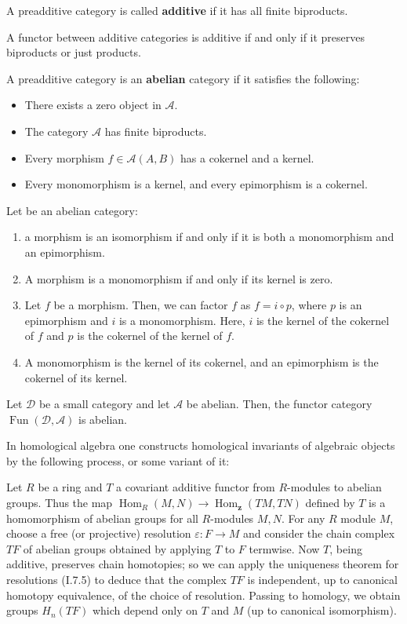 A preadditive category is called \textbf{additive} if it has all finite biproducts.\\

\begin{prop}
A functor between additive categories is additive if and only if it preserves biproducts or just products.
\end{prop}

A preadditive category is an \textbf{abelian} category if it satisfies the following: 
\begin{itemize}
    \item There exists a zero object in $\mathcal{A}$.
    \item The category $\mathcal{A}$ has finite biproducts.
    \item Every morphism $f \in \mathcal{A}(A, B)$ has a cokernel and a kernel.
    \item Every monomorphism is a kernel, and every epimorphism is a cokernel.
\end{itemize}

\begin{theo} Let \ca be an abelian category:
\begin{enumerate}
    \item a morphism is an isomorphism if and only if it is both a monomorphism and an epimorphism.
    \item A morphism is a monomorphism if and only if its kernel is zero.
    \item Let $f$ be a morphism. Then, we can factor $f$ as $f=i \circ p$, where $p$ is an epimorphism and $i$ is a monomorphism. Here, $i$ is the kernel of the cokernel of $f$ and $p$ is the cokernel of the kernel of $f$.
    \item A monomorphism is the kernel of its cokernel, and an epimorphism is the cokernel of its kernel.
\end{enumerate}   
\end{theo}

\begin{prop}
Let $\mathcal{D}$ be a small category and let $\mathcal{A}$ be abelian. Then, the functor category $\operatorname{Fun}(\mathcal{D}, \mathcal{A})$ is abelian.   
\end{prop}

In homological algebra one constructs homological invariants of algebraic objects by the following process, or some variant of it:

Let $R$ be a ring and $T$ a covariant additive functor from $R$-modules to abelian groups. Thus the map $\operatorname{Hom}_R(M, N) \rightarrow \operatorname{Hom}_{\mathbf{z}}(T M, T N)$ defined by $T$ is a homomorphism of abelian groups for all $R$-modules $M, N$. For any $R$ module $M$, choose a free (or projective) resolution $\varepsilon: F \rightarrow M$ and consider the chain complex $T F$ of abelian groups obtained by applying $T$ to $F$ termwise. Now $T$, being additive, preserves chain homotopies; so we can apply the uniqueness theorem for resolutions (I.7.5) to deduce that the complex $T F$ is independent, up to canonical homotopy equivalence, of the choice of resolution. Passing to homology, we obtain groups $H_n(T F)$ which depend only on $T$ and $M$ (up to canonical isomorphism).

